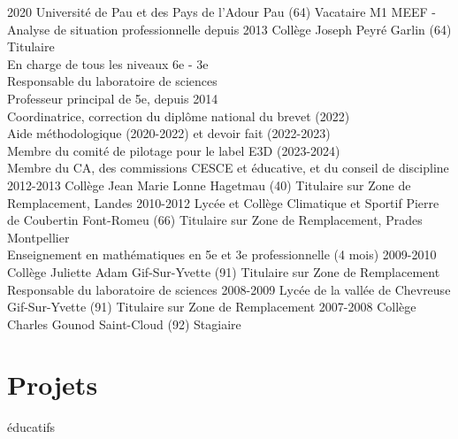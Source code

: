 \documentclass{cv-style-cec}
\begin{document}
\begin{entrylist}
\entry
{2020}
{Université de Pau et des Pays de l'Adour}
{Pau (64)}
{Vacataire M1 MEEF - Analyse de situation professionnelle}
\entry
{depuis 2013}
{Collège Joseph Peyré}
{Garlin (64)}
{Titulaire\\
En charge de tous les niveaux 6e - 3e\\
Responsable du laboratoire de sciences\\
Professeur principal de 5e, depuis 2014\\
Coordinatrice, correction du diplôme national du brevet (2022)\\
Aide méthodologique (2020-2022) et devoir fait (2022-2023)\\
Membre du comité de pilotage pour le label E3D (2023-2024)\\
Membre du CA, des commissions CESCE et éducative, et du conseil de discipline}
\entry
{2012-2013}
{Collège Jean Marie Lonne}
{Hagetmau (40)}
{Titulaire sur Zone de Remplacement, Landes}
\entry
{2010-2012}
{Lycée et Collège Climatique et Sportif Pierre de Coubertin}
{Font-Romeu (66)}
{Titulaire sur Zone de Remplacement, Prades Montpellier\\
Enseignement en mathématiques en 5e et 3e professionnelle (4 mois)
}
\entry
{2009-2010}
{Collège Juliette Adam}
{Gif-Sur-Yvette (91)}
{Titulaire sur Zone de Remplacement\\ Responsable du laboratoire de sciences}
\entry
{2008-2009}
{Lycée de la vallée de Chevreuse}
{Gif-Sur-Yvette (91)}
{Titulaire sur Zone de Remplacement}
\entry
{2007-2008}
{Collège Charles Gounod}
{Saint-Cloud (92)}
{Stagiaire}
\end{entrylist}
\section{Projets }{éducatifs}
\end{document}

